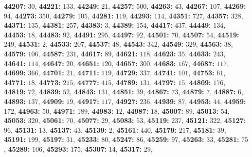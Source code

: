 \textsf{\bfseries 44207:} $30$, \textsf{\bfseries 44221:} $133$, \textsf{\bfseries 44249:} $21$, \textsf{\bfseries 44257:} $500$, \textsf{\bfseries 44263:} $43$, \textsf{\bfseries 44267:} $107$, \textsf{\bfseries 44269:} $94$, \textsf{\bfseries 44273:} $350$, \textsf{\bfseries 44279:} $105$, \textsf{\bfseries 44281:} $119$, \textsf{\bfseries 44293:} $114$, \textsf{\bfseries 44351:} $727$, \textsf{\bfseries 44357:} $328$, \textsf{\bfseries 44371:} $135$, \textsf{\bfseries 44381:} $257$, \textsf{\bfseries 44383:} $3$, \textsf{\bfseries 44389:} $154$, \textsf{\bfseries 44417:} $437$, \textsf{\bfseries 44449:} $134$, \textsf{\bfseries 44453:} $18$, \textsf{\bfseries 44483:} $92$, \textsf{\bfseries 44491:} $295$, \textsf{\bfseries 44497:} $92$, \textsf{\bfseries 44501:} $70$, \textsf{\bfseries 44507:} $54$, \textsf{\bfseries 44519:} $249$, \textsf{\bfseries 44531:} $2$, \textsf{\bfseries 44533:} $207$, \textsf{\bfseries 44537:} $48$, \textsf{\bfseries 44543:} $342$, \textsf{\bfseries 44549:} $329$, \textsf{\bfseries 44563:} $38$, \textsf{\bfseries 44579:} $106$, \textsf{\bfseries 44587:} $231$, \textsf{\bfseries 44617:} $89$, \textsf{\bfseries 44621:} $118$, \textsf{\bfseries 44623:} $35$, \textsf{\bfseries 44633:} $243$, \textsf{\bfseries 44641:} $114$, \textsf{\bfseries 44647:} $20$, \textsf{\bfseries 44651:} $120$, \textsf{\bfseries 44657:} $300$, \textsf{\bfseries 44683:} $167$, \textsf{\bfseries 44687:} $117$, \textsf{\bfseries 44699:} $366$, \textsf{\bfseries 44701:} $21$, \textsf{\bfseries 44711:} $119$, \textsf{\bfseries 44729:} $337$, \textsf{\bfseries 44741:} $101$, \textsf{\bfseries 44753:} $61$, \textsf{\bfseries 44771:} $18$, \textsf{\bfseries 44773:} $215$, \textsf{\bfseries 44777:} $415$, \textsf{\bfseries 44789:} $131$, \textsf{\bfseries 44797:} $15$, \textsf{\bfseries 44809:} $176$, \textsf{\bfseries 44819:} $72$, \textsf{\bfseries 44839:} $52$, \textsf{\bfseries 44843:} $131$, \textsf{\bfseries 44851:} $39$, \textsf{\bfseries 44867:} $73$, \textsf{\bfseries 44879:} $7$, \textsf{\bfseries 44887:} $6$, \textsf{\bfseries 44893:} $137$, \textsf{\bfseries 44909:} $19$, \textsf{\bfseries 44917:} $117$, \textsf{\bfseries 44927:} $236$, \textsf{\bfseries 44939:} $87$, \textsf{\bfseries 44953:} $44$, \textsf{\bfseries 44959:} $172$, \textsf{\bfseries 44963:} $50$, \textsf{\bfseries 44971:} $189$, \textsf{\bfseries 44983:} $12$, \textsf{\bfseries 44987:} $18$, \textsf{\bfseries 45007:} $89$, \textsf{\bfseries 45013:} $54$, \textsf{\bfseries 45053:} $320$, \textsf{\bfseries 45061:} $70$, \textsf{\bfseries 45077:} $29$, \textsf{\bfseries 45083:} $53$, \textsf{\bfseries 45119:} $237$, \textsf{\bfseries 45121:} $322$, \textsf{\bfseries 45127:} $96$, \textsf{\bfseries 45131:} $13$, \textsf{\bfseries 45137:} $43$, \textsf{\bfseries 45139:} $2$, \textsf{\bfseries 45161:} $440$, \textsf{\bfseries 45179:} $217$, \textsf{\bfseries 45181:} $39$, \textsf{\bfseries 45191:} $199$, \textsf{\bfseries 45197:} $31$, \textsf{\bfseries 45233:} $80$, \textsf{\bfseries 45247:} $86$, \textsf{\bfseries 45259:} $97$, \textsf{\bfseries 45263:} $33$, \textsf{\bfseries 45281:} $75$, \textsf{\bfseries 45289:} $106$, \textsf{\bfseries 45293:} $175$, \textsf{\bfseries 45307:} $14$, \textsf{\bfseries 45317:} $29$, 
